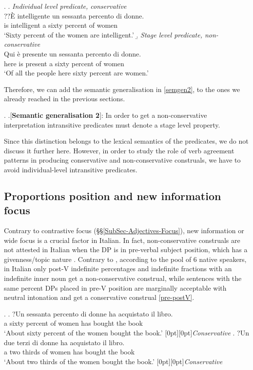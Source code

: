 \documentclass[charis, linguex]{glossa}
\newcommand{\rcommentg}[1]{\hfill\raisebox{1.9\baselineskip}[0pt][0pt]{#1}}
\begin{document}
\ex. \a. \textit{Individual level predicate, conservative} \\
\gll  ??\`{E} intelligente un sessanta percento di donne. \\
      is intelligent a sixty percent of women \\
\glt `Sixty percent of the women are intelligent.'\label{indiv} 
\b. \textit{Stage level predicate, non-conservative} \\
\gll  Qui \`{e} presente un sessanta percento di donne. \\
      here is present a sixty percent of women \\
\glt `Of all the people here sixty percent are women.'  \label{stage}

Therefore, we can add the semantic generalisation in \ref{semgen2}, to the ones we already reached in the previous sections.

\ex. \label{semgen2} \a.[{\bf Semantic generalisation 2}]: In order to get a non-conservative interpretation intransitive predicates must denote a stage level property.

Since this distinction belongs to the lexical semantics of the predicates, we do not discuss it further here. However, in order to study the role of verb agreement patterns in producing conservative and non-conservative construals, we have to avoid individual-level intransitive predicates.

\subsection{Proportions position and new information focus} \label{Sub-Sec-Position}

Contrary to contrastive focus (\S\S\ref{SubSec-Adjectives-Focus}), new information or wide focus is a crucial factor in Italian. In fact, non-conservative construals are not attested in Italian when the DP is in pre-verbal subject position, which has a givenness/topic nature \citep{cha76}. Contrary to \citet[ex.44]{ahn17}, according to the pool of 6 native speakers, in Italian only post-V indefinite percentages and indefinite fractions with an indefinite inner noun  get a non-conservative construal, while sentences with the same percent DPs placed in pre-V position are marginally acceptable  with neutral intonation and get a conservative construal \ref{pre-postV}.
 
\ex. \label{pre-postV} \ag. ?Un sessanta percento di donne ha acquistato il libro. \\
      a sixty percent of women has bought the book\\
   \glt    `About sixty percent of the women bought the book.' \label{non-cons-postv}  \rcommentg{\textit{Conservative}}
   \bg.  ?Un due terzi di donne ha acquistato il libro. \\
         a two thirds of women has bought the book\\
      \glt    `About two thirds of the women bought the book.' \label{non-cons-postv-fra} \rcommentg{\textit{Conservative}}
\end{document}

